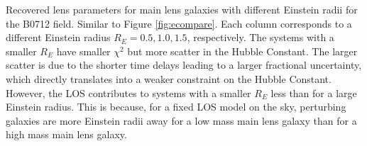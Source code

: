 \label{fig:recompare} Recovered lens parameters for main lens galaxies with different Einstein radii for the B0712 field. Similar to Figure \ref{fig:ecompare}. Each column corresponds to a different Einstein radius $R_E = 0.5,1.0,1.5$, respectively. The systems with a smaller $R_E$ have smaller $\chi^2$ but more scatter in the Hubble Constant. The larger scatter is due to the shorter time delays leading to a larger fractional uncertainty, which directly translates into a weaker constraint on the Hubble Constant. However, the LOS contributes to systems with a smaller $R_E$ less than for a large Einstein radius. This is because, for a fixed LOS model on the sky, perturbing galaxies are more Einstein radii away for a low mass main lens galaxy than for a high mass main lens galaxy. 